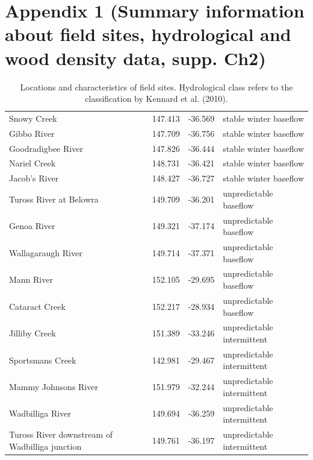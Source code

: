 \chapter[Appendix 1 (Summary information about field sites, hydrological and wood density data, supp. Ch2)]{Appendix 1 (Summary information about field sites, hydrological and wood density data, supp. Ch2)}

\begin{table}[ht]
\tiny
\centering
\caption[Locations and characteristics of field sites.]{\small{Locations and characteristics of field sites. Hydrological class refers to the classification by Kennard et al. (2010).}}
\label{tab:Ch2sup_T1}
{\tabulinesep=1.2mm
\begin{tabu}to 
\hline
{} &  &  &  \\
\hline
Snowy Creek & 147.413 & -36.569 & stable winter baseflow \\
Gibbo River & 147.709 & -36.756 & stable winter baseflow \\
Goodradigbee River & 147.826 & -36.444 & stable winter baseflow \\
Nariel Creek & 148.731 & -36.421 & stable winter baseflow \\
Jacob’s River & 148.427 & -36.727 & stable winter baseflow \\
Tuross River at Belowra & 149.709 & -36.201 & unpredictable baseflow \\
Genoa River & 149.321 & -37.174 & unpredictable baseflow \\
Wallagaraugh River & 149.714 & -37.371 & unpredictable baseflow \\
Mann River & 152.105 & -29.695 & unpredictable baseflow \\
Cataract Creek & 152.217 & -28.934 & unpredictable baseflow \\
Jilliby Creek & 151.389 & -33.246 & unpredictable intermittent \\
Sportsmans Creek & 142.981 & -29.467 & unpredictable intermittent \\
Mammy Johnsons River & 151.979 & -32.244 & unpredictable intermittent \\
Wadbilliga River & 149.694 & -36.259 & unpredictable intermittent \\
Tuross River downstream of Wadbilliga junction & 149.761 & -36.197 & unpredictable intermittent \\ \hline
\end{tabu}}
\end{table}
\clearpage

